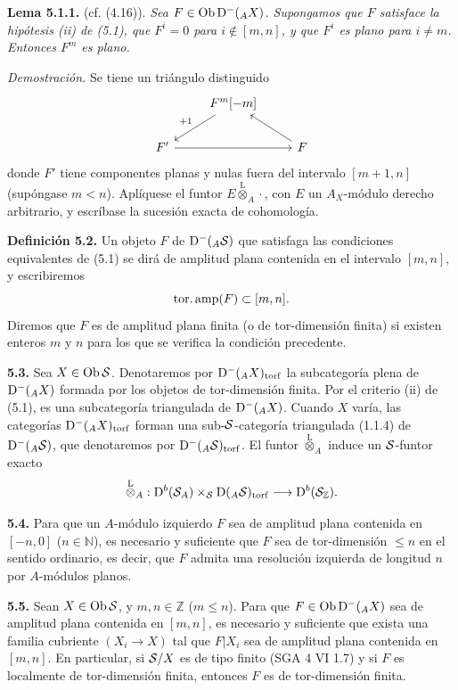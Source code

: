 \textbf{Lema 5.1.1.} (cf. (4.16)). \emph{Sea \(F\in\Ob\Dpx^-({}_A X)\). Supongamos que \(F\) satisface la hipótesis (ii) de (5.1), que \(F^i=0\) para \(i\notin[m,n]\), y que \(F^i\) es plano para \(i\ne m\). Entonces \(F^m\) es plano.}

\emph{Demostración.} Se tiene un triángulo distinguido
\[
\begin{tikzcd}
& F^m[-m] \arrow[dl,"+1"'] & \\
F' \arrow[rr] && F \arrow[ul]
\end{tikzcd}
\]
donde \(F'\) tiene componentes planas y nulas fuera del intervalo \([m+1,n]\) (supóngase \(m<n\)). Aplíquese el funtor \(E\overset{\mathrm L}{\otimes}_A\cdot\), con \(E\) un \(A_X\)-módulo derecho arbitrario, y escríbase la sucesión exacta de cohomología.

\textbf{Definición 5.2.} Un objeto \(F\) de \(\Dpx^-({}_A \sisi{S}{\mathcal S})\) que satisfaga las condiciones equivalentes de (5.1) se dirá de amplitud plana contenida en el intervalo \([m,n]\), y escribiremos
\[
  \toramp(F)\subset[m,n].
\]
Diremos que \(F\) es de amplitud plana finita (o de tor-dimensión finita) si existen enteros \(m\) y \(n\) para los que se verifica la condición precedente.

\textbf{5.3.} Sea \(X\in\Ob \sisi{S}{\mathcal S}\). Denotaremos por \(\Dpx^-({}_A X)_{\torf}\) la subcategoría plena de \(\Dpx^-({}_A X)\) formada por los objetos de tor-dimensión finita. Por el criterio (ii) de (5.1), es una subcategoría triangulada de \(\Dpx^-({}_A X)\). Cuando \(X\) varía, las categorías \(\Dpx^-({}_A X)_{\torf}\) forman una sub-\(\sisi{S}{\mathcal S}\)-categoría triangulada (1.1.4) de \(\Dpx^-({}_A \sisi{S}{\mathcal S})\), que denotaremos por \(\Dpx^-({}_A \sisi{S}{\mathcal S})_{\torf}\). El funtor \(\overset{\mathrm L}{\otimes}_A\) induce un \(\sisi{S}{\mathcal S}\)-funtor exacto
\[
  \overset{\mathrm L}{\otimes}_A:
  \Dpx^b(\sisi{S}{\mathcal S}_A)\times\sisi{_S}{_{\mathcal S}} \Dpx({}_A \sisi{S}{\mathcal S})_{\torf}
  \longrightarrow \Dpx^b(\sisi{S}{\mathcal S}_{\mathbb Z}).
\]

\textbf{5.4.} Para que un \(A\)-módulo izquierdo \(F\) sea de amplitud plana contenida en \([-n,0]\) (\(n\in\mathbb N\)), es necesario y suficiente que \(F\) sea de tor-dimensión \(\leq n\) en el sentido ordinario, es decir, que \(F\) admita una resolución izquierda de longitud \(n\) por \(A\)-módulos planos.

\textbf{5.5.} Sean \(X\in\Ob \sisi{S}{\mathcal S}\), y \(m,n\in\mathbb Z\) (\(m\leq n\)). Para que \(F\in\Ob\Dpx^-({}_A X)\) sea de amplitud plana contenida en \([m,n]\), es necesario y suficiente que exista una familia cubriente \((X_i\to X)\) tal que \(F|X_i\) sea de amplitud plana contenida en \([m,n]\). En particular, si \(\sisi{S}{\mathcal S}/X\) es de tipo finito (SGA 4 VI 1.7) y si \(F\) es localmente de tor-dimensión finita, entonces \(F\) es de tor-dimensión finita.

